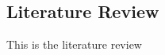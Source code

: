\documentclass[../../sections/introduction.tex]{subfiles}
\begin{document}
\subsection{Literature Review}
    This is the literature review
\end{document}
